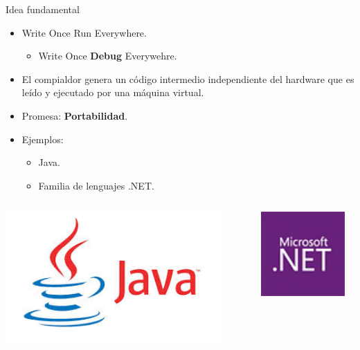 \begin{frame}[t]{Idea fundamental}
  \begin{itemize}
    \item Write Once Run Everywhere.
      \begin{itemize}
        \item \pause Write Once \textbf{\color{red}Debug} Everywehre.
      \end{itemize}
    \item \pause El compialdor genera un código intermedio independiente del hardware que es leído y ejecutado por una máquina virtual.
    \item \pause Promesa: \textbf{\color{blue}Portabilidad}.
    \item Ejemplos:
      \begin{itemize}
        \item Java.
        \item Familia de lenguajes .NET.
      \end{itemize}
  \end{itemize}
\pause
\begin{columns}
  \begin{column}{0.2\textwidth}
    \includegraphics[width=0.9\textwidth]{images/java.jpg}
  \end{column}
  \begin{column}{0.1\textwidth}
    \includegraphics[width=0.9\textwidth]{images/dotnet.jpg}

\end{column}
\end{columns}
\end{frame}
